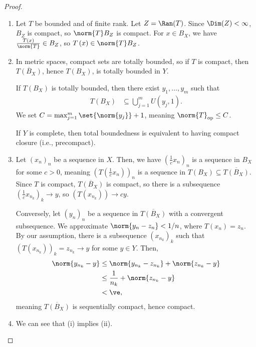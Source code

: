 \documentclass[10pt]{mypackage}
\begin{document}
\begin{proof}\hfill
  \begin{enumerate}[(1)]
    \item Let $T$ be bounded and of finite rank. Let $Z = \Ran(T)$. Since $\Dim(Z) < \infty$, $B_{Z}$ is compact, so $\norm{T}B_Z$ is compact. For $x\in B_X$, we have $\frac{T\left(x\right)}{\norm{T}}\in B_{Z}$, so $T\left(x\right)\in \norm{T}B_{Z}$.
    \item In metric spaces, compact sets are totally bounded, so if $T$ is compact, then $\overline{T\left(B_X\right)}$, hence $T\left(B_X\right)$, is totally bounded in $Y$.\newline

      If $T\left(B_X\right)$ is totally bounded, then there exist $y_1,\dots,y_m$ such that
      \begin{align*}
        T\left(B_X\right) &\subseteq \bigcup_{j=1}^{m}U\left(y_j,1\right).
      \end{align*}
      We set $C = \max_{j=1}^{m}\set{\norm{y_j}} + 1$, meaning $\norm{T}_{\text{op}} \leq C$.\newline

      If $Y$ is complete, then total boundedness is equivalent to having compact closure (i.e., precompact).
    \item Let $\left(x_n\right)_n$ be a sequence in $X$. Then, we have $\left(\frac{1}{c}x_n\right)_n$ is a sequence in $B_X$ for some $c > 0$, meaning $\left(T\left(\frac{1}{c}x_n\right)\right)_n$ is a sequence in $T\left(B_X\right)\subseteq \overline{T\left(B_X\right)}$. Since $T$ is compact, $\overline{T\left(B_{X}\right)}$ is compact, so there is a subsequence $\left(\frac{1}{c}x_{n_k}\right)_{k}\rightarrow y$, so $\left(T\left(x_{n_k}\right)\right)\rightarrow cy$.\newline

      Conversely, let $\left(y_n\right)_n$ be a sequence in $\overline{T\left(B_{X}\right)}$ with a convergent subsequence. We approximate $\norm{y_n - z_n} < 1/n$, where $T\left(x_n\right) = z_n$. By our assumption, there is a subsequence $\left(x_{n_k}\right)_{k}$ such that $\left(T\left(x_{n_k}\right)\right)_{k} = z_{n_k}\rightarrow y$ for some $y\in Y$. Then,
      \begin{align*}
        \norm{y_{n_k} - y} &\leq \norm{y_{n_k} - z_{n_k}} + \norm{z_{n_k} - y}\\
                           &\leq \frac{1}{n_k} + \norm{z_{n_k} - y}\\
                           &< \ve,
      \end{align*}
      meaning $\overline{T\left(B_X\right)}$ is sequentially compact, hence compact.
    \item We can see that (i) implies (ii).\newline


\end{enumerate}
\end{proof}
\end{document}
